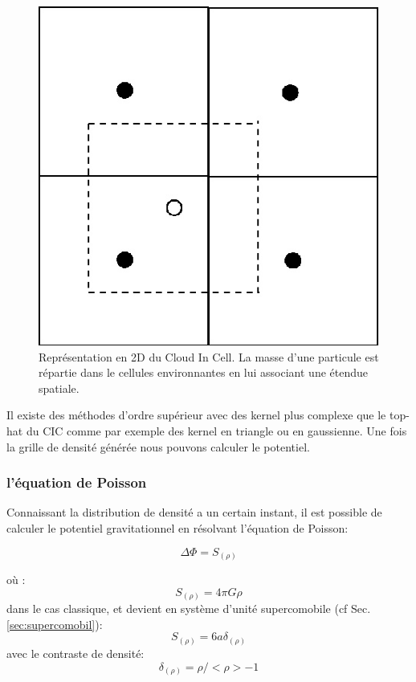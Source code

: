 \begin{figure}[bth]
		\centering
        \includegraphics[width=.5\linewidth]{img/02/CIC.jpg} 
        \caption{Représentation en 2D du Cloud In Cell. 
        La masse d'une particule est répartie dans le cellules environnantes en lui associant une étendue spatiale.
}
 		\label{fig:CIC}
\end{figure}

Il existe des méthodes d'ordre supérieur avec des kernel plus complexe que le top-hat du \ac{CIC} comme par exemple des kernel en triangle ou en gaussienne.
Une fois la grille de densité générée nous pouvons calculer le potentiel.

\subsubsection{l'équation de Poisson}

Connaissant la distribution de densité a un certain instant, il est possible de calculer le potentiel gravitationnel en résolvant l'équation de Poisson:

\begin{equation}
\Delta \Phi = S_{(\rho)}
\end{equation}

où :
\begin{equation}
S_{(\rho)} = 4 \pi G \rho
\end{equation}
dans le cas classique, et devient en système d'unité supercomobile (cf Sec. \ref{sec:supercomobil}):
\begin{equation}
S_{(\rho)} = 6 a \delta_{(\rho)}
\end{equation}
avec le contraste de densité: 
\begin{equation}
\delta_{(\rho)} = \rho / < \rho > - 1 
\end{equation}

